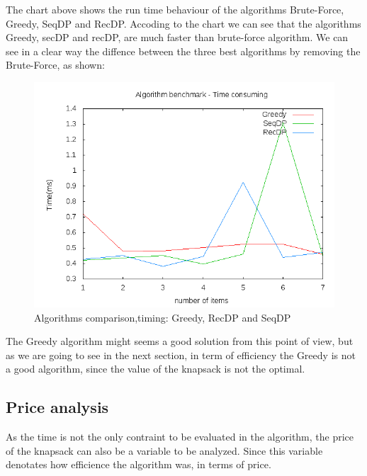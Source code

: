 \documentclass{article}
\begin{document}
The chart above shows the run time behaviour of the algorithms Brute-Force, Greedy, SeqDP and RecDP. 
Accoding to the chart we can see that the algorithms Greedy, secDP and recDP, are much faster than brute-force algorithm.
We can see in a clear way the diffence between the three best algorithms by removing the Brute-Force, as shown: 

\begin{figure} [H]
\includegraphics[scale=0.4]{report/time_analysis_no_bf}
\caption{Algorithms comparison,timing: Greedy, RecDP and SeqDP}
\label{report/time_analysis_no_bf}
\end{figure}

The Greedy algorithm might seems a good solution from this point of view, but as we are going to see in the next section, 
in term of efficiency the Greedy is not a good algorithm, since the value of the knapsack is not the optimal.

\subsection{Price analysis}

As the time is not the only contraint to be evaluated in the algorithm, the price of the knapsack can also be a variable
to be analyzed. Since this variable denotates how efficience the algorithm was, in terms of price.
\end{document}
